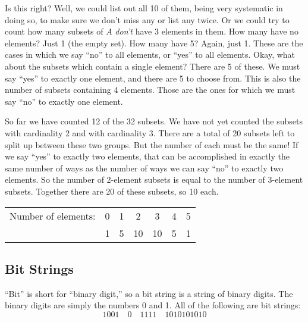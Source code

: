 \documentclass[10pt,]{book}
\theoremstyle{plain}
\theoremstyle{definition}
\theoremstyle{definition}
\theoremstyle{definition}
\numberwithin{equation}{section}
\newcommand{\hrulethin}  {\noalign{\hrule height 0.04em}}
\begin{document}
        Is this right? Well, we could list out all 10 of them, being very systematic in doing so, to make sure we don't miss any or list any twice. Or we could try to count how many subsets of \(A\) \emph{don't} have 3 elements in them. How many have no elements? Just 1 (the empty set). How many have 5? Again, just 1. These are the cases in which we say ``no'' to all elements, or ``yes'' to all elements. Okay, what about the subsets which contain a single element? There are 5 of these. We must say ``yes'' to exactly one element, and there are 5 to choose from. This is also the number of subsets containing 4 elements. Those are the ones for which we must say ``no'' to exactly one element.
\par

        So far we have counted 12 of the 32 subsets. We have not yet counted the subsets with cardinality 2 and with cardinality 3. There are a total of 20 subsets left to split up between these two groups. But the number of each must be the same! If we say ``yes'' to exactly two elements, that can be accomplished in exactly the same number of ways as the number of ways we can say ``no'' to exactly two elements. So the number of 2-element subsets is equal to the number of 3-element subsets. Together there are 20 of these subsets, so 10 each.
\leavevmode%
\begin{table}
\centering
\begin{tabular}{lllllll}
\multicolumn{1}{c}{Number of elements:}&\multicolumn{1}{c}{0}&\multicolumn{1}{c}{1}&\multicolumn{1}{c}{2}&\multicolumn{1}{c}{3}&\multicolumn{1}{c}{4}&\multicolumn{1}{c}{5}\tabularnewline\hrulethin
\multicolumn{1}{c}{Number of subsets:}&\multicolumn{1}{c}{1}&\multicolumn{1}{c}{5}&\multicolumn{1}{c}{10}&\multicolumn{1}{c}{10}&\multicolumn{1}{c}{5}&\multicolumn{1}{c}{1}
\end{tabular}
\end{table}
\typeout{************************************************}
\typeout{************************************************}
\subsection[
        Bit Strings
      ]{
        Bit Strings
      }\label{subsection-13}
 ``Bit'' is short for ``binary digit,'' so a bit string is a string of binary digits. The binary digits are simply the numbers 0 and 1. All of the following are bit strings:
      \begin{equation*}
        1001 \quad 0 \quad 1111 \quad 1010101010
      \end{equation*}
\par
\end{document}
